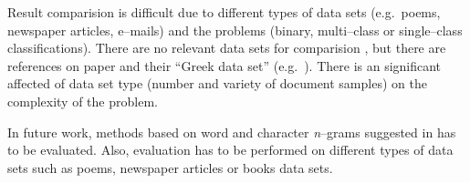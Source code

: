 \documentclass[11pt,english]{article}
\begin{document}
\begin{multicols}{2}
Result comparision is difficult due to different types of data sets (e.g.\ poems,
newspaper articles, e--mails) and the problems (binary, multi--class or
single--class classifications). There are no relevant data sets for comparision
\citep{zhao2005effective}, but there are references on paper
\citep{stamatatos2001computer} and their ``Greek data set'' (e.g.\
\citep{keselj2003n}). There is an significant affected of data set type (number
and variety of document samples) on the complexity of the problem.

In future work, methods based on word and character \emph{n}--grams suggested
in \citep{keselj2003n,peng2003language,coyotl2006authorship} has to be
evaluated. Also, evaluation has to be performed on different types of data sets
such as poems, newspaper articles or books data sets.




\end{multicols}
\end{document}
